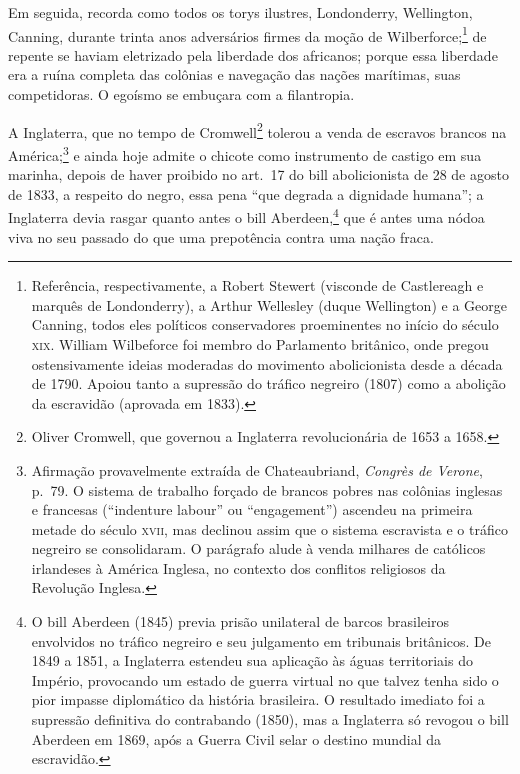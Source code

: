 \begin{linenumbers}
 Em seguida, recorda como todos os torys ilustres, Londonderry,
Wellington, Canning, durante trinta anos adversários firmes da moção de
Wilberforce;\footnote{ Referência, respectivamente, a Robert Stewert (visconde de Castlereagh
e marquês de Londonderry), a Arthur Wellesley (duque Wellington) e a
George Canning, todos eles políticos conservadores proeminentes no
início do século \textsc{xix}. William Wilbeforce foi membro do Parlamento
britânico, onde pregou ostensivamente ideias moderadas do movimento
abolicionista desde a década de 1790. Apoiou tanto a supressão do
tráfico negreiro (1807) como a abolição da escravidão (aprovada em 1833).} 
de repente se haviam eletrizado pela liberdade dos africanos; porque
essa liberdade era a ruína completa das colônias e navegação das nações
marítimas, suas competidoras. O egoísmo se embuçara com a filantropia.

 A Inglaterra, que no tempo de Cromwell\footnote{ Oliver Cromwell, 
que governou a Inglaterra revolucionária de 1653 a 1658.}
 tolerou a venda de escravos brancos na América;\footnote{ Afirmação provavelmente extraída de Chateaubriand, 
\textit{Congrès de Verone}, p.~79. O sistema de trabalho forçado de brancos pobres nas
colônias inglesas e francesas (``indenture labour'' ou ``engagement'')
ascendeu na primeira metade do século \textsc{xvii}, mas declinou assim que o
sistema escravista e o tráfico negreiro se consolidaram. O parágrafo
alude à venda milhares de católicos irlandeses à América Inglesa, no
contexto dos conflitos religiosos da Revolução Inglesa.} 
e ainda hoje admite o chicote como instrumento de castigo em sua
marinha, depois de haver proibido no art.~17 do bill abolicionista de
28 de agosto de 1833, a respeito do negro, essa pena ``que degrada a
dignidade humana''; a Inglaterra devia rasgar quanto antes o bill
Aberdeen,\footnote{ O bill Aberdeen (1845) previa prisão unilateral de barcos 
brasileiros envolvidos no tráfico negreiro e seu julgamento em tribunais britânicos. 
De 1849 a 1851, a Inglaterra estendeu sua aplicação às águas territoriais do Império, 
provocando um estado de guerra virtual no que talvez tenha sido o pior impasse diplomático 
da história brasileira. O resultado imediato foi a supressão definitiva do contrabando (1850), 
mas a Inglaterra só revogou o bill Aberdeen em 1869, após a Guerra Civil selar o destino mundial da escravidão.} 
que é antes uma nódoa viva no seu passado do que uma prepotência contra uma nação fraca.


\end{linenumbers}
